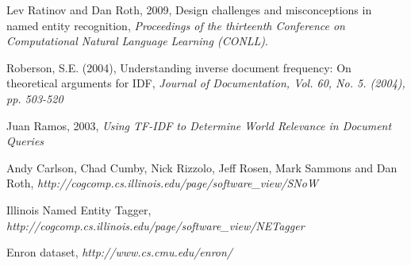 \documentclass[senior,oneside]{UIUC}
\begin{document}
\begin{thebibliography}{9}

  Lev Ratinov and Dan Roth, 2009,
  Design challenges and misconceptions in named entity recognition,
  \emph{Proceedings of the thirteenth Conference on Computational Natural Language Learning (CONLL)}.

Roberson, S.E. (2004),
Understanding inverse document frequency: On theoretical arguments for IDF,
 \emph{Journal of Documentation, Vol. 60, No. 5. (2004), pp. 503-520}

  Juan Ramos, 2003,
  \emph{Using TF-IDF to Determine World Relevance in Document Queries}

 Andy Carlson, Chad Cumby, Nick Rizzolo, Jeff Rosen, Mark Sammons and Dan Roth, 
 \emph{http://cogcomp.cs.illinois.edu/page/software\_view/SNoW}

Illinois Named Entity Tagger, 
\emph{http://cogcomp.cs.illinois.edu/page/software\_view/NETagger}

  Enron dataset,
  \emph{http://www.cs.cmu.edu/\texttildelow{}enron/}
 
\end{thebibliography}
\end{document}
